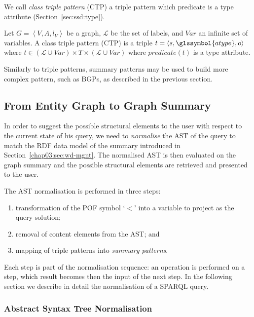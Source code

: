 We call \emph{class triple pattern} (CTP) a triple pattern which predicate is a type attribute (Section~\ref{sec:ssd:type}).

\begin{definition}
	Let $G=\left\langle V, A, l_V \right\rangle$ be a graph, $\mathcal{L}$ be the set of labels, and $Var$ an infinite set of variables.
	A class triple pattern (CTP) is a triple $t= \langle s, \glssymbol{atype}, o \rangle$ where $t \in (\mathcal{L} \cup Var) \times T \times (\mathcal{L} \cup Var)$ where $predicate(t)$ is a type attribute.
	\label{def:class-triple-pattern}
\end{definition}

Similarly to triple patterns, summary patterns may be used to build more complex pattern, such as BGPs, as described in the previous section.

\subsection{From Entity Graph to Graph Summary}

In order to suggest the possible structural elements to the user with respect to the current state of his query, we need to \emph{normalise} the AST of the query to match the RDF data model of the summary introduced in Section~\ref{chap03:sec:wd-mgnt}. The normalised AST is then evaluated on the graph summary and the possible structural elements are retrieved and presented to the user.

The AST normalisation is performed in three steps:
\begin{enumerate}
	\item transformation of the \gls{POF} symbol `$<$' into a variable to project as the query solution;
	\item removal of content elements from the AST; and
	\item mapping of triple patterns into \emph{summary patterns}.
\end{enumerate}
Each step is part of the normalisation sequence: an operation is performed on a step, which result becomes then the input of the next step.
In the following section we describe in detail the normalisation of a SPARQL query.

\subsubsection{Abstract Syntax Tree Normalisation}


